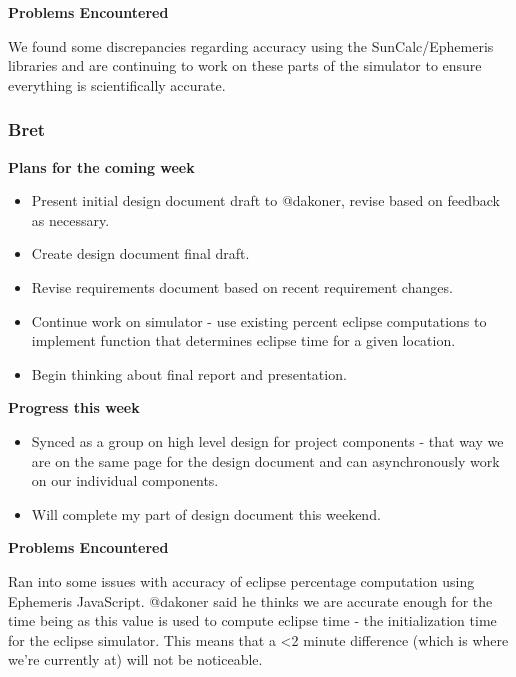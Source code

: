 \documentclass[10pt, onecolumn, draftclsnofoot, letterpaper, compsoc]{IEEEtran}
\begin{document}
    \noindent \textbf{Problems Encountered}

    We found some discrepancies regarding accuracy using the SunCalc/Ephemeris libraries
    and are continuing to work on these parts of the simulator to ensure everything is
    scientifically accurate.

    \subsubsection{Bret}

    \noindent \textbf{Plans for the coming week}

    \begin{itemize}

    \item Present initial design document draft to @dakoner, revise based on feedback as necessary.
    \item Create design document final draft.
    \item Revise requirements document based on recent requirement changes.
    \item Continue work on simulator - use existing percent eclipse computations to implement function that
      determines eclipse time for a given location.
    \item Begin thinking about final report and presentation.

    \end{itemize}

    \noindent \textbf{Progress this week}

    \begin{itemize}

    \item Synced as a group on high level design for project components - that way we are on the same page for the
      design document and can asynchronously work on our individual components.
    \item Will complete my part of design document this weekend.

    \end{itemize}

    \noindent \textbf{Problems Encountered}

    Ran into some issues with accuracy of eclipse percentage computation using Ephemeris JavaScript. @dakoner
    said he thinks we are accurate enough for the time being as this value is used to compute eclipse time - the
    initialization time for the eclipse simulator. This means that a <2 minute difference (which is where we're
    currently at) will not be noticeable.
\end{document}
